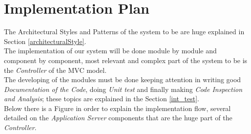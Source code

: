 \section{Implementation Plan}
The Architectural Styles and Patterns of the system to be are huge explained in Section \ref{architecturalStyle}.\\
The implementation of our system will be done module by module and component by component, most relevant and complex part of the system to be is the \textit{Controller} of the MVC model.\\
The developing of the modules must be done keeping attention in writing good \textit{Documentation of the Code}, doing \textit{Unit test} and
finally making \textit{Code Inspection and Analysis}; these topics are explained in the Section \ref{int_test}.\\
Below there is a Figure in order to explain the implementation flow, several detailed on the \textit{Application Server} components that are the huge part of the \textit{Controller}.

